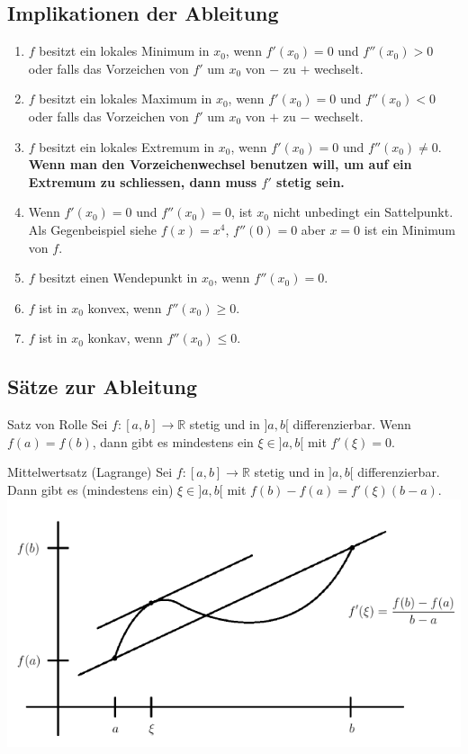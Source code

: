 \documentclass[a4paper,fontsize = 7pt]{scrartcl}
\def\R{\mathbb{R}}
\begin{document}
\subsection{Implikationen der Ableitung}
\begin{enumerate}
  \item $f$ besitzt ein lokales Minimum in $x_0$, wenn $f'(x_0) = 0$ und $f''(x_0) > 0$ oder falls das Vorzeichen von $f'$ um $x_0$ von $-$ zu $+$ wechselt.
  \item $f$ besitzt ein lokales Maximum in $x_0$, wenn $f'(x_0) = 0$ und $f''(x_0) < 0$ oder falls das Vorzeichen von $f'$ um $x_0$ von $+$ zu $-$ wechselt.
  \item $f$ besitzt ein lokales Extremum in $x_0$, wenn $f'(x_0) = 0$ und $f''(x_0) \ne 0$.
   \\ \textbf{Wenn man den Vorzeichenwechsel benutzen will, um auf ein Extremum zu schliessen, dann muss $f'$ stetig sein. }
  \item Wenn $f'(x_0) = 0$ und $f''(x_0) = 0$, ist $x_0$ nicht unbedingt ein Sattelpunkt. 
  \\Als Gegenbeispiel siehe $f(x)= x^4$, $f''(0) = 0$ aber $x = 0$ ist ein Minimum von $f$.
  \item $f$ besitzt einen Wendepunkt in $x_0$, wenn $f''(x_0) = 0$.
  \item $f$ ist in $x_0$ konvex, wenn $f''(x_0) \ge 0$.
  \item $f$ ist in $x_0$ konkav, wenn $f''(x_0) \le 0$.
\end{enumerate}

\subsection{Sätze zur Ableitung}
\begin{subbox}{Satz von Rolle}
  \vspace{-4pt}
 Sei $f: [a,b] \to \R$ stetig und in $]a,b[$ differenzierbar. Wenn $f(a) = f(b)$, dann gibt es mindestens ein $\xi \in ]a,b[$ mit $f'(\xi) = 0$.
 \vspace{-4pt}
\end{subbox}
\begin{mainbox}{Mittelwertsatz (Lagrange)}
  \vspace{-4pt}
 Sei $f: [a,b] \to \R$ stetig und in $]a,b[$ differenzierbar. Dann gibt es (mindestens ein) $\xi \in ]a,b[$ mit $f(b) - f(a) = f'(\xi)(b-a)$.
 \includegraphics[width=\linewidth]{mittelwertsatz.png}
 \vspace{-4pt}
\end{mainbox}
\end{document}
